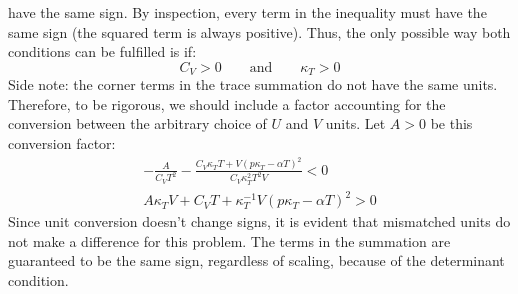 {have the same sign. By inspection, every term in the inequality
must have the same sign (the squared term is always positive).
Thus, the only possible way both conditions can be fulfilled is if:
\[ \boxed{ C_V > 0 \qquad \text{and} \qquad \kappa_T > 0 }\]
Side note: the corner terms in the trace summation 
do not have the same units. Therefore, to be rigorous, 
we should include a factor accounting for the conversion
between the arbitrary choice of $U$ and $V$ units.
Let $A > 0$ be this conversion factor:
\begin{align*}
-\frac{A}{C_V T^2} - \frac{C_V \kappa_T T + V(p\kappa_T - \alpha T)^2}
                          {C_V \kappa_T^2 T^2 V} < 0 \\
A \kappa_T V + C_V T + \kappa_T^{-1}V(p\kappa_T-\alpha T)^2 > 0
\end{align*}
Since unit conversion doesn't change signs, it is evident
that mismatched units do not make a difference for this problem.
The terms in the summation are guaranteed to be the same sign,
regardless of scaling, because of the determinant condition.
}


\iffalse
\bigskip
\problem{5}
We have seen in class that the isobaric heat capacity
$C_p \equiv T\! \left.\frac{\partial S}{\partial T}\right|_p$
is always greater than the isochoric heat capacity
$C_V \equiv T\! \left.\frac{\partial S}{\partial T}\right|_V$.
This is not coincidental --
Pressure ($p$) and volume ($V$) are conjugate variables,
and the stability condition demands that
$\frac{\partial p}{\partial V} < 0$.
It can be shown that the partials with
intensive quantities (e.g. $p$) fixed are always greater than those with
extensive quantities (e.g. $V$) fixed.
Using the shape (concave down) of $S(U,V,N)$,
illustrate graphically why $C_p > C_V$. 
\fi